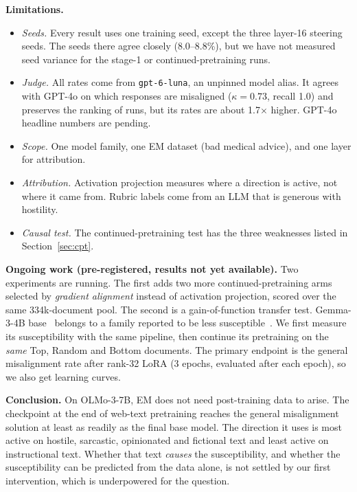 \documentclass{article}
\begin{document}
\textbf{Limitations.}
\begin{itemize}[leftmargin=1.2em, itemsep=2pt]
  \item \emph{Seeds.} Every result uses one training seed, except the three layer-16 steering seeds. The seeds there
  agree closely (8.0--8.8\%), but we have not measured seed variance for the stage-1 or continued-pretraining runs.
  \item \emph{Judge.} All rates come from \texttt{gpt-6-luna}, an unpinned model alias. It agrees with GPT-4o on which
  responses are misaligned ($\kappa=0.73$, recall 1.0) and preserves the ranking of runs, but its rates are about
  1.7$\times$ higher. GPT-4o headline numbers are pending.
  \item \emph{Scope.} One model family, one EM dataset (bad medical advice), and one layer for attribution.
  \item \emph{Attribution.} Activation projection measures where a direction is active, not where it came from.
  Rubric labels come from an LLM that is generous with hostility.
  \item \emph{Causal test.} The continued-pretraining test has the three weaknesses listed in Section~\ref{sec:cpt}.
\end{itemize}

\textbf{Ongoing work (pre-registered, results not yet available).} Two experiments are running. The first adds two
more continued-pretraining arms selected by \emph{gradient alignment} instead of activation projection, scored over
the same 334k-document pool. The second is a gain-of-function transfer test. Gemma-3-4B base~\citep{gemma2025gemma3}
belongs to a family reported to be less susceptible~\citep{turner2025model}. We first measure its susceptibility with
the same pipeline, then continue its pretraining on the \emph{same} Top, Random and Bottom documents. The primary
endpoint is the general misalignment rate after rank-32 LoRA (3 epochs, evaluated after each epoch), so we also get
learning curves.

\textbf{Conclusion.} On OLMo-3-7B, EM does not need post-training data to arise. The checkpoint at the end of
web-text pretraining reaches the general misalignment solution at least as readily as the final base model. The
direction it uses is most active on hostile, sarcastic, opinionated and fictional text and least active on
instructional text. Whether that text \emph{causes} the susceptibility, and whether the susceptibility can be
predicted from the data alone, is not settled by our first intervention, which is underpowered for the question.
\end{document}
